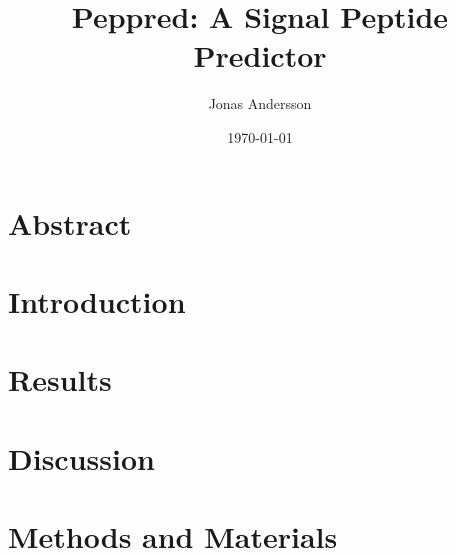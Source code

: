 \documentclass{article}
\author{Jonas Andersson}
\title{Peppred: A Signal Peptide Predictor}
\date{\today}
\begin{document}
\maketitle
\section{Abstract}
\section{Introduction}
\section{Results}
\section{Discussion}
\section{Methods and Materials}
\end{document}
